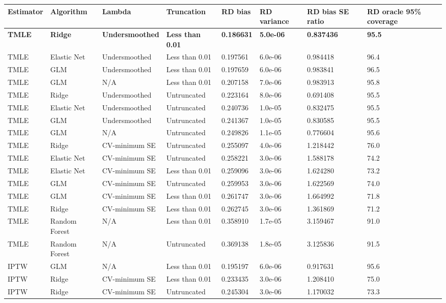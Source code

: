 
\begin{longtable}[l]{llllllll}
\toprule
Estimator & Algorithm & Lambda & Truncation & RD bias & RD variance & RD bias SE ratio & RD oracle 95\% coverage\\
\midrule
\midrule
\textbf{TMLE} & \textbf{Ridge} & \textbf{Undersmoothed} & \textbf{Less than 0.01} & \textbf{0.186631} & \textbf{5.0e-06} & \textbf{0.837436} & \textbf{95.5}\\
\midrule
TMLE & Elastic Net & Undersmoothed & Less than 0.01 & 0.197561 & 6.0e-06 & 0.984418 & 96.4\\
TMLE & GLM & Undersmoothed & Less than 0.01 & 0.197659 & 6.0e-06 & 0.983841 & 96.5\\
TMLE & GLM & N/A & Less than 0.01 & 0.207158 & 7.0e-06 & 0.983913 & 95.8\\
TMLE & Ridge & Undersmoothed & Untruncated & 0.223164 & 8.0e-06 & 0.691408 & 95.5\\
TMLE & Elastic Net & Undersmoothed & Untruncated & 0.240736 & 1.0e-05 & 0.832475 & 95.5\\
TMLE & GLM & Undersmoothed & Untruncated & 0.241367 & 1.0e-05 & 0.830585 & 95.5\\
TMLE & GLM & N/A & Untruncated & 0.249826 & 1.1e-05 & 0.776604 & 95.6\\
TMLE & Ridge & CV-minimum SE & Untruncated & 0.255097 & 4.0e-06 & 1.218442 & 76.0\\
TMLE & Elastic Net & CV-minimum SE & Untruncated & 0.258221 & 3.0e-06 & 1.588178 & 74.2\\
TMLE & Elastic Net & CV-minimum SE & Less than 0.01 & 0.259096 & 3.0e-06 & 1.624280 & 73.2\\
TMLE & GLM & CV-minimum SE & Untruncated & 0.259953 & 3.0e-06 & 1.622569 & 74.0\\
TMLE & GLM & CV-minimum SE & Less than 0.01 & 0.261747 & 3.0e-06 & 1.664992 & 71.8\\
TMLE & Ridge & CV-minimum SE & Less than 0.01 & 0.262745 & 3.0e-06 & 1.361869 & 71.2\\
TMLE & Random Forest & N/A & Less than 0.01 & 0.358910 & 1.7e-05 & 3.159467 & 91.0\\
TMLE & Random Forest & N/A & Untruncated & 0.369138 & 1.8e-05 & 3.125836 & 91.5\\
IPTW & GLM & N/A & Less than 0.01 & 0.195197 & 6.0e-06 & 0.917631 & 95.6\\
IPTW & Ridge & CV-minimum SE & Less than 0.01 & 0.233435 & 3.0e-06 & 1.208410 & 75.0\\
IPTW & Ridge & CV-minimum SE & Untruncated & 0.245304 & 3.0e-06 & 1.170032 & 73.3\\

\end{longtable}
